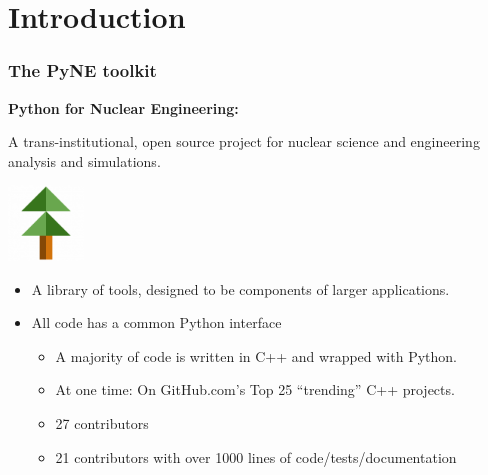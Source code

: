 \documentclass[12pt]{beamer}
\begin{document}
\section{Introduction}
\begin{frame}[fragile]
\frametitle{The PyNE toolkit}

\centerline{\bf Python for Nuclear Engineering:}
A trans-institutional, open source project for nuclear science and engineering analysis and simulations.

\centerline{\includegraphics[width=2cm]{figures/pyne_icon_small.png}}

\begin{itemize}
\item{A library of tools, designed to be components of larger applications.}
\item{All code has a common Python interface}
\begin{itemize}
\item{A majority of code is written in C++ and wrapped with Python.}
\item{At one time: On GitHub.com's Top 25 ``trending'' C++ projects.}
\item{27 contributors}
\item{21 contributors with over 1000 lines of code/tests/documentation}
\end{itemize}
\end{itemize}


\end{frame}
\end{document}
